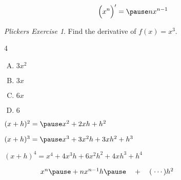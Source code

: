 \documentclass[17pt, handout]{beamer}
\theoremstyle{remark}
\newtheorem{plickers}{Plickers Exercise}
\begin{document}
\begin{frame}
\begin{theorem}
\[\Big(x^n\Big)' = \pause nx^{n-1}\]
\end{theorem}

\pause
\begin{plickers}
Find the derivative of $f(x) = x^3$.
\begin{multicols}4
\begin{enumerate}[A.]
\item $3x^2$ \item $3x$ \item $6x$ \item $6$
\end{enumerate}
\end{multicols}
\end{plickers}
\end{frame}

\begin{frame}
\begin{fact}
\par\bigskip
$(x+h)^2 = \pause x^2 + 2xh + h^2$ \pause\par\bigskip
$(x+h)^3 = \pause x^3 + 3x^2h + 3xh^2 + h^3$ \pause\par\bigskip
$(x+h)^4 = x^4 + 4x^3h + 6x^2h^2 + 4xh^3 + h^4$ \pause\par\bigskip\bigskip

%

$\phantom{(x+h)^n = {}}x^n \pause + nx^{n-1}h \pause \quad+\quad (\hspace{0.6ex}\cdots)h^2$ 

\end{fact}
\end{frame}
\end{document}
